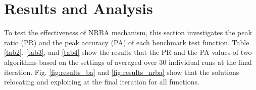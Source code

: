 \documentclass[conference]{IEEEtran}
\begin{document}

\section{Results and Analysis}
To test the effectiveness of NRBA mechanism, this section investigates the peak ratio (PR) and the peak accuracy (PA) of each benchmark test function. Table \ref{tab2}, \ref{tab3}, and \ref{tab4} show the results that the PR and the PA values of two algorithms based on the settings of averaged over 30 individual runs at the final iteration. Fig. \ref{fig:results_ba} and \ref{fig:results_nrba} show that the solutions relocating and exploiting at the final iteration for all functions.
\end{document}
